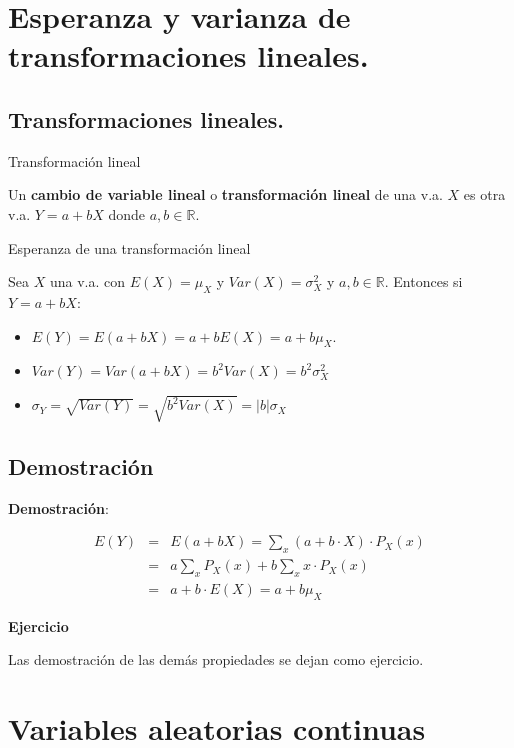 \documentclass[]{book}
\providecommand{\tightlist}{%
  \setlength{\itemsep}{0pt}\setlength{\parskip}{0pt}}
\begin{document}
\hypertarget{esperanza-y-varianza-de-transformaciones-lineales.}{%
\section{Esperanza y varianza de transformaciones lineales.}\label{esperanza-y-varianza-de-transformaciones-lineales.}}

\hypertarget{transformaciones-lineales.}{%
\subsection{Transformaciones lineales.}\label{transformaciones-lineales.}}

 Transformación lineal

Un \textbf{cambio de variable lineal} o \textbf{transformación lineal} de una v.a. \(X\) es otra v.a. \(Y= a+ b X\) donde \(a,b\in\mathbb{R}\).

 Esperanza de una transformación lineal

Sea \(X\) una v.a. con \(E(X)=\mu_{X}\) y \(Var(X)=\sigma_{X}^2\) y \(a,b\in\mathbb{R}\).
Entonces si \(Y=a+b X\):

\begin{itemize}
\tightlist
\item
  \(E(Y)=E(a + b X)=a+ b E(X)= a + b \mu_{X}\).
\item
  \(Var(Y)=Var(a+bX)=b^2 Var(X)= b^2 \sigma_{X}^2\)
\item
  \(\sigma_{Y}=\sqrt{Var(Y)}=\sqrt{b^2 Var(X)}=|b| \sigma_{X}\)
\end{itemize}

\hypertarget{demostraciuxf3n-1}{%
\subsection{Demostración}\label{demostraciuxf3n-1}}

\textbf{Demostración}:

\begin{eqnarray*}
E(Y)&=& E(a+bX)=\sum_{x}(a+b\cdot X)\cdot P_{X}(x)\\
&=& a \sum_{x} P_{X}(x) + b \sum_{x} x\cdot P_{X}(x)\\ 
&=& a + b\cdot E(X)=a + b \mu_{X}
\end{eqnarray*}

\textbf{Ejercicio}

Las demostración de las demás propiedades se dejan como ejercicio.

\hypertarget{variables-aleatorias-continuas}{%
\section{Variables aleatorias continuas}\label{variables-aleatorias-continuas}}
\end{document}
